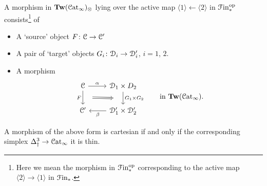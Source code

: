 \documentclass[main.tex]{subfiles}
\begin{document}
\begin{example}
  A morphism in $\mathbf{Tw}(\mathcal{C}\mathrm{at}_{\infty})_{\otimes}$ lying over the active map $\langle 1 \rangle \leftarrow \langle 2 \rangle$ in $\mathcal{F}\mathrm{in}_{*}^{\mathrm{op}}$ consists\footnote{Here we mean the morphism in $\mathcal{F}\mathrm{in}_{*}^{\mathrm{op}}$ corresponding to the active map $\langle 2 \rangle \to \langle 1 \rangle$ in $\mathcal{F}\mathrm{in}_{*}$.} of
  \begin{itemize}
    \item A `source' object $F\colon \mathcal{C} \to \mathcal{C}'$

    \item A pair of `target' objects $G_{i}\colon \mathcal{D}_{i} \to \mathcal{D}'_{i}$, $i = 1$, $2$.

    \item A morphism
      \begin{equation*}
        \begin{tikzcd}
          \category{C}
          \arrow[r, "\alpha"]
          \arrow[d, ""{name=L, right}, "F"{left}]
          & \category{D}_{1} \times D_{2}
          \arrow[d, ""{name=R, left}, "G_{1} \times G_{2}"{right}]
          \\
          \category{C}'
          & \category{D}'_{1} \times \category{D}'_{2}
          \arrow[l, "\beta"]
          \arrow[Rightarrow, from=L, to=R, shorten=2ex]
        \end{tikzcd}
        \qquad\text{in }\Tw(\ICat).
      \end{equation*}
  \end{itemize}

  A morphism of the above form is cartesian if and only if the corresponding simplex $\Delta^{3}_{\dagger} \to \mathcal{C}\mathrm{at}_{\infty}$ it is thin.
\end{example}
\end{document}
